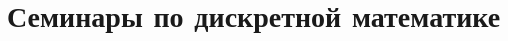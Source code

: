 \documentclass[utf8, 14pt]{article}
\begin{document}
\section*{Семинары по дискретной математике}
\thispagestyle{empty}
\tableofcontents
\setcounter{page}{0}
\clearpage

\end{document}
